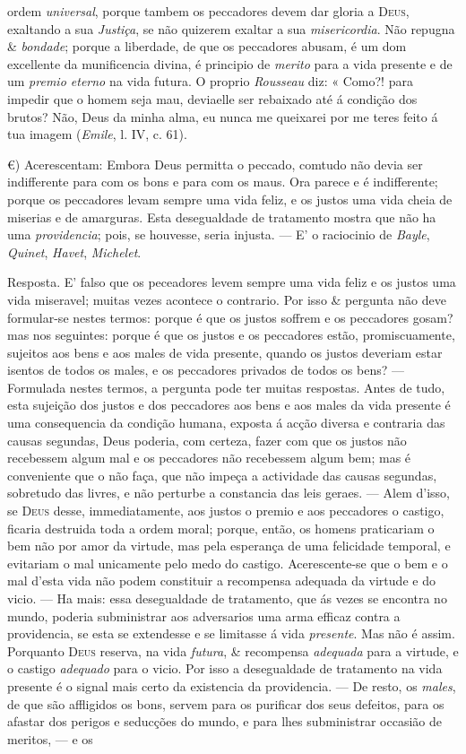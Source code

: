 ordem \emph{universal}, porque tambem os peccadores devem dar gloria a \textsc{Deus}, exaltando a sua \emph{Justiça}, se não quizerem exaltar a sua \emph{misericordia}. Não repugna \& \emph{bondade}; porque a liberdade, de que os peccadores abusam, é um dom excellente da munificencia divina, é principio de \emph{merito} para a vida presente e de um \emph{premio eterno} na vida futura. O proprio \emph{Rousseau} diz: « Como?! para impedir que o homem seja mau, deviaelle ser rebaixado até á condição dos brutos? Não, Deus da minha alma, eu nunca me queixarei por me teres feito á tua imagem (\emph{Emile}, l. IV, c. 61).\par €) Acerescentam: Embora Deus permitta o peccado, comtudo não devia ser indifferente para com os bons e para com os maus. Ora parece e é indifferente; porque os peccadores levam sempre uma vida feliz, e os justos uma vida cheia de miserias e de amarguras. Esta desegualdade de tratamento mostra que não ha uma \emph{providencia}; pois, se houvesse, seria injusta. --- E' o raciocinio de \emph{Bayle}, \emph{Quinet}, \emph{Havet}, \emph{Michelet}.\par Resposta. E' falso que os peceadores levem sempre uma vida feliz e os justos uma vida miseravel; muitas vezes acontece o contrario. Por isso \& pergunta não deve formular-se nestes termos: porque é que os justos soffrem e os peccadores gosam? mas nos seguintes: porque é que os justos e os peccadores estão, promiscuamente, sujeitos aos bens e aos males de vida presente, quando os justos deveriam estar isentos de todos os males, e os peccadores privados de todos os bens? --- Formulada nestes termos, a pergunta pode ter muitas respostas. Antes de tudo, esta sujeição dos justos e dos peccadores aos bens e aos males da vida presente é uma consequencia da condição humana, exposta á acção diversa e contraria das causas segundas, Deus poderia, com certeza, fazer com que os justos não recebessem algum mal e os peccadores não recebessem algum bem; mas é conveniente que o não faça, que não impeça a actividade das causas segundas, sobretudo das livres, e não perturbe a constancia das leis geraes. --- Alem d'isso, se \textsc{Deus} desse, immediatamente, aos justos o premio e aos peccadores o castigo, ficaria destruida toda a ordem moral; porque, então, os homens praticariam o bem não por amor da virtude, mas pela esperança de uma felicidade temporal, e evitariam o mal unicamente pelo medo do castigo. Acerescente-se que o bem e o mal d'esta vida não podem constituir a recompensa adequada da virtude e do vicio. --- Ha mais: essa desegualdade de tratamento, que ás vezes se encontra no mundo, poderia subministrar aos adversarios uma arma efficaz contra a providencia, se esta se extendesse e se limitasse á vida \emph{presente}. Mas não é assim. Porquanto \textsc{Deus} reserva, na vida \emph{futura}, \& recompensa \emph{adequada} para a virtude, e o castigo \emph{adequado} para o vicio. Por isso a desegualdade de tratamento na vida presente é o signal mais certo da existencia da providencia. --- De resto, os \emph{males}, de que são affligidos os bons, servem para os purificar dos seus defeitos, para os afastar dos perigos e seducções do mundo, e para lhes subministrar occasião de meritos, --- e os 